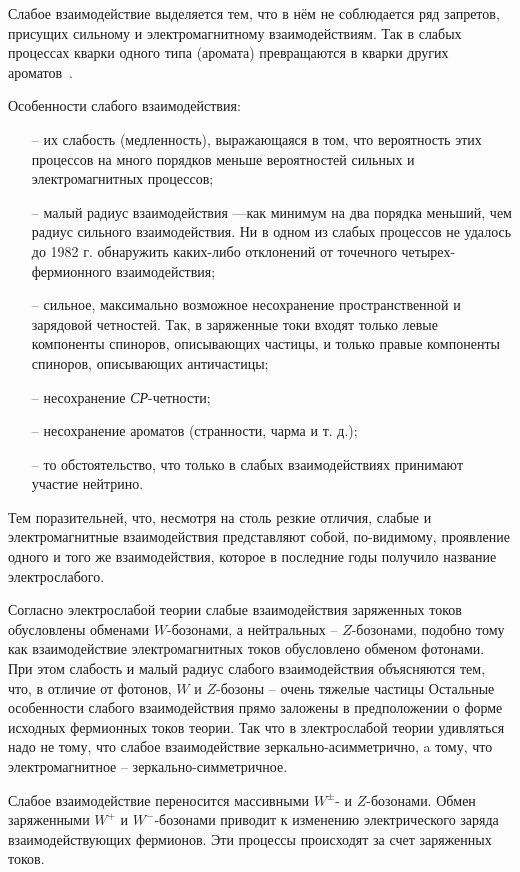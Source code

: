 Слабое взаимодействие выделяется тем, что в нём не соблюдается ряд запретов, присущих сильному и электромагнитному взаимодействиям. Так в слабых процессах кварки одного типа (аромата) превращаются в кварки других ароматов~\cite{nuclphys:weak}.

Особенности слабого взаимодействия:
\begin{enumerate}
	\item[--] их слабость (медленность), выражающаяся в том, что
	вероятность этих процессов на много порядков меньше
	вероятностей сильных и электромагнитных процессов;
	
	\item[--] малый радиус взаимодействия —как минимум на
	два порядка меньший, чем радиус сильного взаимодействия.
	Ни в одном из слабых процессов не удалось до 1982 г. обнаружить каких-либо отклонений от точечного четырех-
	фермионного взаимодействия;
	
	\item[--] сильное, максимально возможное несохранение пространственной и зарядовой четностей. Так, в заряженные
	токи входят только левые компоненты спиноров, описывающих частицы, и только правые компоненты спиноров,
	описывающих античастицы;
	
	\item[--] несохранение \textit{СР}-четности;
	
	\item[--] несохранение ароматов (странности, чарма и т. д.);
	
	\item[--]  то обстоятельство, что только в слабых взаимодействиях принимают участие нейтрино.
	
\end{enumerate}

Тем поразительней, что, несмотря на столь резкие отличия, слабые и электромагнитные взаимодействия представляют собой, по-видимому, проявление одного и того же
взаимодействия, которое в последние годы получило название электрослабого.

Согласно электрослабой теории слабые взаимодействия
заряженных токов обусловлены обменами $W$-бозонами, а
нейтральных -- $Z$-бозонами, подобно тому как взаимодействие электромагнитных токов обусловлено обменом фотонами. При этом слабость и малый радиус слабого взаимодействия объясняются тем, что, в отличие от фотонов, $W$ и $Z$-бозоны -- очень тяжелые частицы Остальные особенности слабого взаимодействия прямо заложены в предположении о форме исходных фермионных токов теории.
Так что в злектрослабой теории удивляться надо не тому,
что слабое взаимодействие зеркально-асимметрично, a тому, что электромагнитное -- зеркально-симметричное.

Слабое взаимодействие переносится массивными $W^±$- и $Z$-бозонами. Обмен заряженными $W^+$ и $W^-$-бозонами приводит к изменению электрического заряда взаимодействующих фермионов. Эти процессы происходят за счет заряженных токов.




